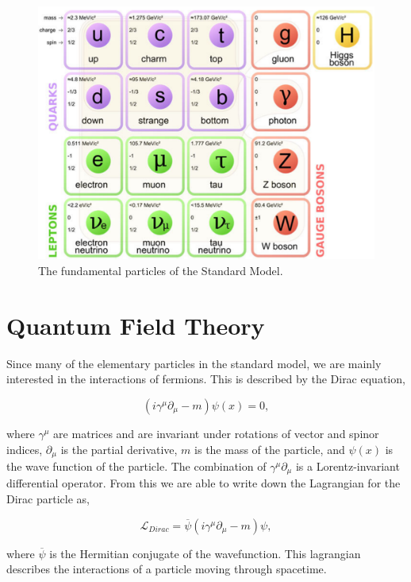 \begin{figure}
 	\centering
	\includegraphics{plots/StandardModel.pdf}
 	\caption{The fundamental particles of the Standard Model.}
 	\label{SMParticles} 
\end{figure}
 
 \section{Quantum Field Theory}
 \label{QFT}
 
 Since many of the elementary particles in the standard model, we are mainly interested in the interactions of fermions. This is described by the Dirac equation, 
 
\begin{equation}
(i\gamma^\mu\partial_\mu-m)\psi(x)=0\label{Dirac},
\end{equation}

where $\gamma^\mu$ are matrices and are invariant under rotations of vector and spinor indices, $\partial_\mu$ is the partial derivative, $m$ is the mass of the particle, and $\psi(x)$ is the wave function of the particle. The combination of $\gamma^\mu\partial_\mu$ is a Lorentz-invariant differential operator. From this we are able to write down the Lagrangian for the Dirac particle as, 

\begin{equation}
\mathcal{L}_{Dirac}=\overline{\psi}(i\gamma^\mu\partial_\mu-m)\psi,
\end{equation}
 
 where $\overline{\psi}$ is the Hermitian conjugate of the wavefunction. This lagrangian describes the interactions of a particle moving through spacetime. 


